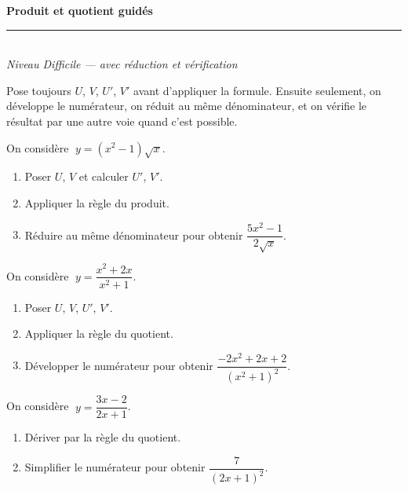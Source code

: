 \pagestyle{fancy}\fancyhf{}
\fancyfoot[C]{\small\thepage}
\renewcommand{\headrulewidth}{0.8pt}



\begin{center}
{\LARGE\bfseries\color{primarydark} Produit et quotient guidés}\\[2pt]
{\color{primary}\rule{0.5\textwidth}{1.2pt}}\\[4pt]
{\small\itshape Niveau Difficile --- avec réduction et vérification}
\end{center}
\vspace{2mm}

\begin{methode}
Pose toujours $U$, $V$, $U'$, $V'$ avant d'appliquer la formule. Ensuite seulement, on développe le numérateur, on réduit au même dénominateur, et on vérifie le résultat par une autre voie quand c'est possible.
\end{methode}

\begin{exo}
On considère $\;y=(x^{2}-1)\sqrt{x}$.
\begin{enumerate}[label=\alph*),leftmargin=1.6em,itemsep=1pt]
\item Poser $U$, $V$ et calculer $U'$, $V'$.
\item Appliquer la règle du produit.
\item Réduire au même dénominateur pour obtenir $\dfrac{5x^{2}-1}{2\sqrt{x}}$.
\end{enumerate}
\end{exo}

\begin{exo}
On considère $\;y=\dfrac{x^{2}+2x}{x^{2}+1}$.
\begin{enumerate}[label=\alph*),leftmargin=1.6em,itemsep=1pt]
\item Poser $U$, $V$, $U'$, $V'$.
\item Appliquer la règle du quotient.
\item Développer le numérateur pour obtenir $\dfrac{-2x^{2}+2x+2}{(x^{2}+1)^{2}}$.
\end{enumerate}
\end{exo}

\begin{exo}
On considère $\;y=\dfrac{3x-2}{2x+1}$.
\begin{enumerate}[label=\alph*),leftmargin=1.6em,itemsep=1pt]
\item Dériver par la règle du quotient.
\item Simplifier le numérateur pour obtenir $\dfrac{7}{(2x+1)^{2}}$.
\end{enumerate}
\end{exo}

